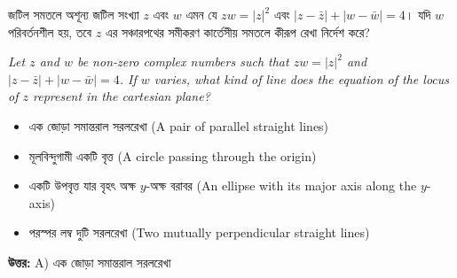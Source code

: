 \documentclass[12pt, a4paper]{article}
\begin{document}
\vspace{1.5em}

\begin{tcolorbox}[questionbox={প্রশ্ন (Question) 9}]
    \noindent
    জটিল সমতলে অশূন্য জটিল সংখ্যা $z$ এবং $w$ এমন যে $zw = |z|^2$ এবং $|z - \bar{z}| + |w - \bar{w}| = 4$। যদি $w$ পরিবর্তনশীল হয়, তবে $z$ এর সঞ্চারপথের সমীকরণ কার্তেসীয় সমতলে কীরূপ রেখা নির্দেশ করে?
    
    \vspace{0.8em}
    \begin{english}
    \noindent\textit{\color{darkgray}
    Let $z$ and $w$ be non-zero complex numbers such that $zw = |z|^2$ and $|z - \bar{z}| + |w - \bar{w}| = 4$. If $w$ varies, what kind of line does the equation of the locus of $z$ represent in the cartesian plane?
    }
    \end{english}
\end{tcolorbox}

\begin{itemize}[label={}, leftmargin=1cm, itemsep=0.5em]
    \item[\textbf{A)}] এক জোড়া সমান্তরাল সরলরেখা (A pair of parallel straight lines)
    \item[\textbf{B)}] মূলবিন্দুগামী একটি বৃত্ত (A circle passing through the origin)
    \item[\textbf{C)}] একটি উপবৃত্ত যার বৃহৎ অক্ষ $y$-অক্ষ বরাবর (An ellipse with its major axis along the $y$-axis)
    \item[\textbf{D)}] পরস্পর লম্ব দুটি সরলরেখা (Two mutually perpendicular straight lines)
\end{itemize}

\vspace{0.5em}
\begin{tcolorbox}[answerbox]
    \textbf{\color{success} উত্তর:} A) এক জোড়া সমান্তরাল সরলরেখা
\end{tcolorbox}
\vspace{1em}
\end{document}

